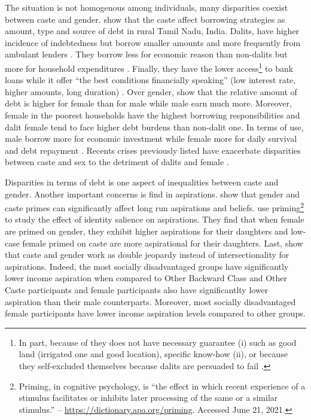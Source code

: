 \documentclass[a4paper, 11pt, onecolumn]{article}
\begin{document}
The situation is not homogenous among individuals, many disparities coexist between caste and gender.
\cite{Guerin2013a} show that the caste affect borrowing strategies as amount, type and source of debt in rural Tamil Nadu, India.
Dalits, have higher incidence of indebtedness but borrow smaller amounts and more frequently from ambulant lenders \citep{Guerin2013a}.
They borrow less for economic reason than non-dalits but more for household expenditures \citep{Guerin2013a, Guerin2014a}.
Finally, they have the lower access\footnote{In part, because of they does not have necessary guarantee (i) such as good land (irrigated one and good location), specific know-how (ii), or because they self-excluded themselves because dalits are persuaded to fail \citep{Guerin2013a}.} to bank loans while it offer ``the best conditions financially speaking'' (low interest rate, higher amounts, long duration) \citep{Guerin2013a, Chavan2007}.
Over gender, \cite{Reboul2021} show that the relative amount of debt is higher for female than for male while male earn much more.
Moreover, female in the poorest households have the highest borrowing responsibilities and dalit female tend to face higher debt burdens than non-dalit one.
In terms of use, male borrow more for economic investment while female more for daily survival and debt repayment \citep{Reboul2021}.
Recents crises previously listed have exacerbate disparities between caste and sex to the detriment of dalits and female \citep{Guerin2021, Guerin2021b}.

Disparities in terms of debt is one aspect of inequalities between caste and gender.
Another important concerns is find in aspirations.
\cite{Mukherjee2017} show that gender and caste primes can significantly affect long run aspirations and beliefs. 
\cite{Alvi2019} use priming\footnote{Priming, in cognitive psychology, is ``the effect in which recent experience of a stimulus facilitates or inhibits later processing of the same or a similar stimulus.'' -- \url{https://dictionary.apa.org/priming}. Accessed June 21, 2021.} to study the effect of identity salience on aspirations.
They find that when female are primed on gender, they exhibit higher aspirations for their daughters and low-case female primed on caste are more aspirational for their daughters.
Last, \cite{Sarkar2020} show that caste and gender work as double jeopardy instead of intersectionality for aspirations.
Indeed, the most socially disadvantaged groups have significantly lower income aspiration when compared to Other Backward Class and Other Caste participants and female participants also have significantlty lower aspiration than their male counterparts.
Moreover, most socially disadvantaged female participants have lower income aspiration levels compared to other groups.
\end{document}
